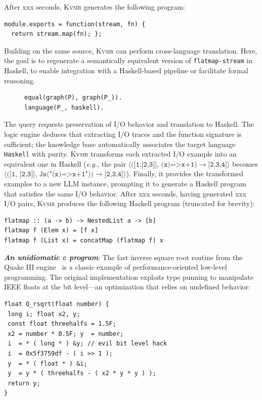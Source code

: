\documentclass[noacm,sigplan]{acmart}
\def\eg{{\em e.g.}, }
\newcommand{\sys}{{\scshape Kv{\textalpha}sir}\xspace}
\newcommand{\heading}[1]{\vspace{2pt}\noindent\textbf{\emph{#1}}:\enspace}
\newcommand{\xxx}{\colorbox{red!30}{xxx}\xspace}
\begin{document}
After \xxx seconds, \sys generates the following program:
\begin{verbatim}
module.exports = function(stream, fn) {
  return stream.map(fn); };
\end{verbatim}


Building on the same source, \sys can perform cross-language
translation. 
Here, the goal is to regenerate a semantically equivalent version
of \texttt{flatmap-stream} in Haskell, to enable integration with a
Haskell-based pipeline or facilitate formal reasoning.

\begin{figure}
\vspace{-10pt}
\begin{verbatim}
equal(graph(P), graph(P_)).
language(P_, haskell).
\end{verbatim}
\end{figure}
The query requests preservation of I/O behavior and translation to Haskell. The
logic engine deduces that extracting I/O traces and the function signature is
sufficient; the knowledge base automatically associates the target language
\texttt{Haskell} with purity.
\sys transforms each extracted I/O example into an equivalent one in Haskell (\eg 
the pair $\langle\texttt{([1,[2,3]], (x)=>x+1)}\to\texttt{[2,3,4]}\rangle$ 
becomes $\langle(\texttt{[1, [2,3]], Js("(x)=>x+1"))}\to\texttt{[2,3,4]}\rangle$).
Finally, it provides the transformed examples to a new LLM instance, prompting it
to generate a Haskell program that satisfies the same I/O behavior.
After \xxx seconds, having generated \xxx I/O pairs, \sys produces the following
Haskell program (truncated for brevity):
\begin{verbatim}
flatmap :: (a -> b) -> NestedList a -> [b]
flatmap f (Elem x) = [f x]
flatmap f (List x) = concatMap (flatmap f) x
\end{verbatim}

\heading{An unidiomatic c program}
The fast inverse square root routine from the Quake III
engine~\cite{fast_inv_sqrt}
is a classic example of performance-oriented low-level programming.
The original implementation exploits type punning to manipulate IEEE
floats at the bit level---an optimization that relies on undefined behavior:

\begin{verbatim}
float Q_rsqrt(float number) {
 long i; float x2, y;
 const float threehalfs = 1.5F;
 x2 = number * 0.5F; y  = number;
 i  = * ( long * ) &y; // evil bit level hack
 i  = 0x5f3759df - ( i >> 1 );
 y  = * ( float * ) &i;
 y  = y * ( threehalfs - ( x2 * y * y ) );
 return y;
}
\end{verbatim}
\end{document}
